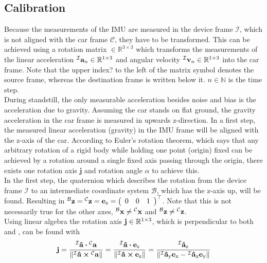 \subsection{Calibration}
Because the measurements of the IMU are measured in the device frame $\mathcal{I}$, which is not aligned with the car frame $\mathcal{C}$, they have to be transformed.
This can be achieved using a rotation matrix  $\in \mathbb{R}^{3\times3}$ which transforms the measurements of the linear acceleration $\vincs{a}{I}_n \in \mathbb{R}^{1\times3}$ and angular velocity ${\vincs{v}{I}_n \in \mathbb{R}^{1\times3}}$ into the car frame.
Note that the upper index? to the left of the matrix symbol denotes the source frame, whereas the destination frame is written below it.
 $n \in \mathbb{N}$ is the time step.\\
During standstill, the only measurable acceleration besides noise and bias is the acceleration due to gravity.
Assuming the car stands on flat ground, the gravity acceleration in the car frame is measured in upwards z-direction.
In a first step, the measured linear acceleration (gravity) in the IMU frame will be aligned with the z-axis of the car.
According to Euler's rotation theorem, which says that any arbitrary rotation of a rigid body while holding one point (origin) fixed can be achieved by a rotation around a single fixed axis passing through the origin, there exists one rotation axis $\mathbf{j}$ and rotation angle $\alpha$ to achieve this.\\
In the first step, the quaternion  which describes the rotation from the device frame $\mathcal{I}$ to an intermediate coordinate system $\mathcal{B}$, which has the z-axis up, will be found.
Resulting in $\vincs{z}{b} = \vincs{z}{c} = \mathbf{e}_\mathrm{z} = \left(\begin{array}{lll} 0 & 0 & 1 \end{array}\right)^{\top}$.
Note that this is not necessarily true for the other axes, $\vincs{x}{b}\neq\vincs{x}{c}$ and $\vincs{z}{b}\neq\vincs{z}{c}$.\\
Using linear algebra  the rotation axis $\vb{j} \in \mathbb{R}^{1\times3}$, which is perpendicular to both  and , can be found with
\begin{equation}
    \vb{j} = \frac{\vincs{\vu{a}}{i} \vdot \vincs{a}{c}}{\norm{\vincs{\vu{a}}{i} \cp \vincs{a}{c}}}
    = \frac{\vincs{\vu{a}}{i} \vdot \vb{e}_\mathrm{z} }{\norm{\vincs{\vu{a}}{i} \cp \vb{e}_\mathrm{z}}}
    = \frac{\vincs{\vu{a}_\mathrm{z}}{i}}{\norm{\vincs{\vu{a}_\mathrm{y}}{i}\vb{e}_\mathrm{x} - \vincs{\vu{a}_\mathrm{x}}{i}\vb{e}_\mathrm{y}}}
\end{equation}
